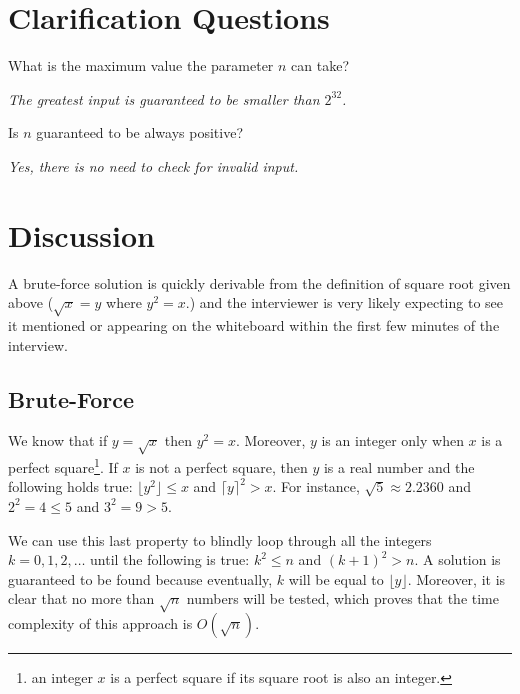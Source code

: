 \section{Clarification Questions}
\begin{QandA}
	\item \begin{questionitem} \begin{question} What is the maximum value the parameter $n$ can take?  \end{question}      
    \begin{answered}
		\textit{The greatest input is guaranteed to be smaller than $2^{32}$.}
	\end{answered} \end{questionitem}
	
	\item \begin{questionitem} \begin{question} Is $n$ guaranteed to be always positive?  \end{question}      
    \begin{answered}
		\textit{Yes, there is no need to check for invalid input.}
	\end{answered} \end{questionitem}
\end{QandA}

\section{Discussion}
A brute-force solution is quickly derivable from the definition of square root given above ($\sqrt{x} = y$ where $y^2 = x$.) and the interviewer
is very likely expecting to see it mentioned or appearing on the whiteboard
within the first few minutes of the interview. 

\subsection{Brute-Force}
We know that if $y = \sqrt{x}$ then $y^2 = x$. Moreover, $y$ is an integer only when $x$ is a perfect square\footnote{an integer $x$ is a perfect square if its square root is also an integer.}. 
If $x$ is not a perfect square, then $y$ is a real number and the following holds true: 
$\lfloor{y}^2 \rfloor \leq x$ and $\lceil{y} \rceil^2 > x$.
For instance, $\sqrt{5} \approx 2.2360$ and $2^2=4 \leq 5$ and $3^2=9 > 5$.

We can use this last property to blindly loop through all the integers $k=0,1,2,\ldots$ until 
the following is true: $k^2\leq n$ and $(k+1)^2 > n$.
A solution is guaranteed to be found because eventually, $k$ will be equal to $\lfloor y \rfloor$.
Moreover, it is clear that no more than $\sqrt{n}$ numbers will be tested, which proves that the time complexity of this approach is $O(\sqrt{n})$.

